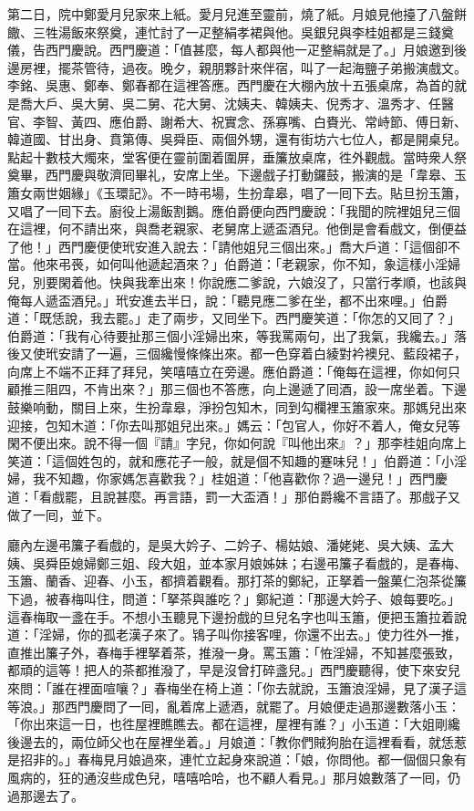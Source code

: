 第二日，院中鄭愛月兒家來上紙。愛月兒進至靈前，燒了紙。月娘見他擡了八盤餅饊、三牲湯飯來祭奠，連忙討了一疋整絹孝裙與他。{}吳銀兒與李桂姐都是三錢奠儀，告西門慶說。西門慶道：「值甚麼，每人都與他一疋整絹就是了。」月娘邀到後邊房裡，擺茶管待，過夜。晚夕，親朋夥計來伴宿，叫了一起海鹽子弟搬演戲文。李銘、吳惠、鄭奉、鄭春都在這裡答應。西門慶在大棚內放十五張桌席，為首的就是喬大戶、吳大舅、吳二舅、花大舅、沈姨夫、韓姨夫、倪秀才、溫秀才、任醫官、李智、黃四、應伯爵、謝希大、祝實念、孫寡嘴、白賚光、常峙節、傅日新、韓道國、甘出身、賁第傳、吳舜臣、兩個外甥，還有街坊六七位人，都是開桌兒。點起十數枝大燭來，堂客便在靈前圍着圍屏，垂簾放桌席，徃外觀戲。當時衆人祭奠畢，西門慶與敬濟囘畢礼，安席上坐。下邊戲子打動鑼鼓，搬演的是「韋皋、玉簫女兩世姻緣」《玉環記》。不一時弔場，生扮韋皋，唱了一囘下去。貼旦扮玉簫，又唱了一囘下去。廚役上湯飯割鵝。應伯爵便向西門慶說：「我聞的院裡姐兒三個在這裡，何不請出來，與喬老親家、老舅席上遞盃酒兒。他倒是會看戲文，倒便益了他！」西門慶便使玳安進入說去：「請他姐兒三個出來。」喬大戶道：「這個卻不當。他來弔䘮，如何叫他遞起酒來？」{}伯爵道：「老親家，你不知，象這樣小淫婦兒，別要閑着他。快與我牽出來！你說應二爹說，六娘沒了，只當行孝順，也該與俺每人遞盃酒兒。」{}玳安進去半日，說：「聽見應二爹在坐，都不出來哩。」伯爵道：「既恁說，我去罷。」走了兩步，又囘坐下。西門慶笑道：「你怎的又囘了？」伯爵道：「我有心待要扯那三個小淫婦出來，等我罵兩句，出了我氣，我纔去。」落後又使玳安請了一遍，三個纔慢條條出來。都一色穿着白綾對衿襖兒、藍段裙子，向席上不端不正拜了拜兒，笑嘻嘻立在旁邊。應伯爵道：「俺每在這裡，你如何只顧推三阻四，不肯出來？」那三個也不答應，向上邊遞了囘酒，設一席坐着。下邊鼓樂响動，關目上來，生扮韋皋，淨扮包知木，同到勾欄裡玉簫家來。那媽兒出來迎接，包知木道：「你去叫那姐兒出來。」媽云：「包官人，你好不着人，俺女兒等閑不便出來。說不得一個『請』字兒，你如何說『叫他出來』？」那李桂姐向席上笑道：「這個姓包的，就和應花子一般，就是個不知趣的蹇味兒！」伯爵道：「小淫婦，我不知趣，你家媽怎喜歡我？」桂姐道：「他喜歡你？過一邊兒！」西門慶道：「看戲罷，且說甚麼。再言語，罰一大盃酒！」那伯爵纔不言語了。那戲子又做了一囘，並下。

廳內左邊弔簾子看戲的，是吳大妗子、二妗子、楊姑娘、潘姥姥、吳大姨、孟大姨、吳舜臣媳婦鄭三姐、段大姐，並本家月娘姊妹；右邊弔簾子看戲的，是春梅、玉簫、蘭香、迎春、小玉，都擠着觀看。那打茶的鄭紀，正拏着一盤菓仁泡茶從簾下過，被春梅叫住，問道：「拏茶與誰吃？」鄭紀道：「那邊大妗子、娘每要吃。」這春梅取一盞在手。不想小玉聽見下邊扮戲的旦兒名字也叫玉簫，便把玉簫拉着說道：「淫婦，你的孤老漢子來了。鴇子叫你接客哩，你還不出去。」{}使力徃外一推，直推出簾子外，春梅手裡拏着茶，推潑一身。罵玉簫：「恠淫婦，不知甚麼張致，都頑的這等！把人的茶都推潑了，早是沒曾打碎盞兒。」西門慶聽得，使下來安兒來問：「誰在裡面喧嚷？」春梅坐在椅上道：「你去就說，玉簫浪淫婦，見了漢子這等浪。」那西門慶問了一囘，亂着席上遞酒，就罷了。月娘便走過那邊數落小玉：「你出來這一日，也徃屋裡瞧瞧去。都在這裡，屋裡有誰？」小玉道：「大姐剛纔後邊去的，兩位師父也在屋裡坐着。」月娘道：「教你們賊狗胎在這裡看看，就恁惹是招非的。」春梅見月娘過來，連忙立起身來說道：「娘，你問他。都一個個只象有風病的，狂的通沒些成色兒，嘻嘻哈哈，也不顧人看見。」那月娘數落了一囘，仍過那邊去了。

